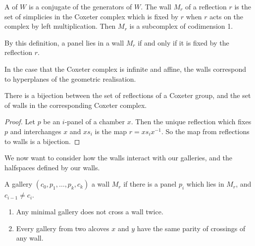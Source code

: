 \documentclass[11pt]{article}
\begin{document}
\begin{definition}
    A  of $W$ is a conjugate of the generators of $W$. The wall $M_r$ of a reflection $r$ is the set of simplicies in the Coxeter complex which is fixed by $r$ when $r$ acts on the complex by left multiplication. Then $M_r$ is a subcomplex of codimension 1.
\end{definition}

By this definition, a panel lies in a wall $M_r$ if and only if it is fixed by the reflection $r$. 

\begin{example}
    In the case that the Coxeter complex is infinite and affine, the walls correspond to hyperplanes of the geometric realisation. 
\end{example}

\begin{theorem}
    There is a bijection between the set of reflections of a Coxeter group, and the set of walls in the corresponding Coxeter complex.
\end{theorem}

\begin{proof}
    Let $p$ be an $i$-panel of a chamber $x$. Then the unique reflection which fixes $p$ and interchanges $x$ and $xs_i$ is the map $r=xs_ix^{-1}$. So the map from reflections to walls is a bijection.
\end{proof}




We now want to consider how the walls interact with our galleries, and the halfspaces defined by our walls.

\begin{definition}
    A gallery $(c_0,p_1,\hdots ,p_k,c_k)$  a wall $M_r$ if there is a panel $p_i$ which lies in $M_r$, and $c_{i-1}\neq c_i$. 
\end{definition}

\begin{lemma}
    \begin{enumerate}
        \item Any minimal gallery does not cross a wall twice.
        \item Every gallery from two alcoves $x$ and $y$ have the same parity of crossings of any wall.
    \end{enumerate}
\end{lemma}
\end{document}
